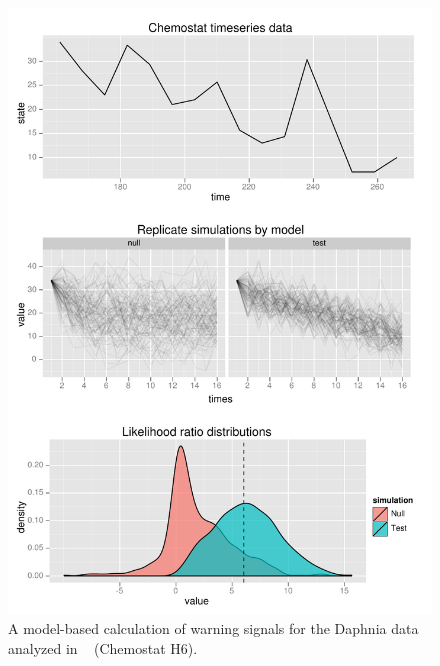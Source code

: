\documentclass[authoryear,review,11pt]{elsarticle}
\begin{document}
 \begin{figure}
   \begin{center}
     \includegraphics[width=.85\linewidth]{figures/Chemostat_warningsignal.pdf}
     \caption{A model-based calculation of warning signals for the Daphnia data analyzed in ~\citet{Drake2010} (Chemostat H6).}
     \label{fig:chemostat}
  \end{center}
 \end{figure}
\end{document}
